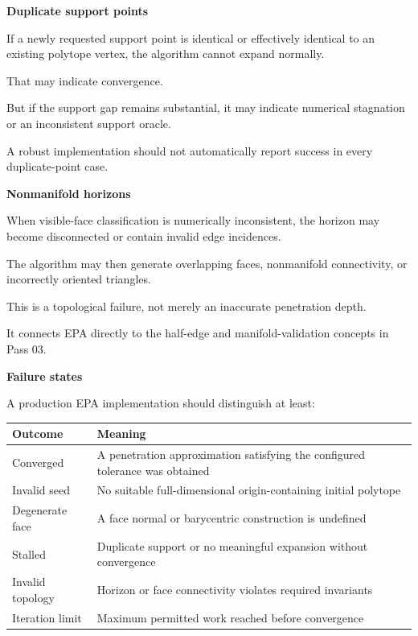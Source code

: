 \textbf{Duplicate support points}

If a newly requested support point is identical or effectively identical to an existing polytope vertex, the algorithm cannot expand normally.

That may indicate convergence.

But if the support gap remains substantial, it may indicate numerical stagnation or an inconsistent support oracle.

A robust implementation should not automatically report success in every duplicate-point case.

\textbf{Nonmanifold horizons}

When visible-face classification is numerically inconsistent, the horizon may become disconnected or contain invalid edge incidences.

The algorithm may then generate overlapping faces, nonmanifold connectivity, or incorrectly oriented triangles.

This is a topological failure, not merely an inaccurate penetration depth.

It connects EPA directly to the half-edge and manifold-validation concepts in Pass 03.

\textbf{Failure states}

A production EPA implementation should distinguish at least:

{\def\LTcaptype{none} %
\begin{longtable}[]{@{}
  >{\raggedright\arraybackslash}p{}
  >{\raggedright\arraybackslash}p{}@{}}
\toprule\noalign{}
\begin{minipage}[b]{\linewidth}\raggedright
Outcome
\end{minipage} & \begin{minipage}[b]{\linewidth}\raggedright
Meaning
\end{minipage} \\
\midrule\noalign{}
\endhead
\bottomrule\noalign{}
\endlastfoot
Converged & A penetration approximation satisfying the configured tolerance was obtained \\
Invalid seed & No suitable full-dimensional origin-containing initial polytope \\
Degenerate face & A face normal or barycentric construction is undefined \\
Stalled & Duplicate support or no meaningful expansion without convergence \\
Invalid topology & Horizon or face connectivity violates required invariants \\
Iteration limit & Maximum permitted work reached before convergence \\
\end{longtable}
}

